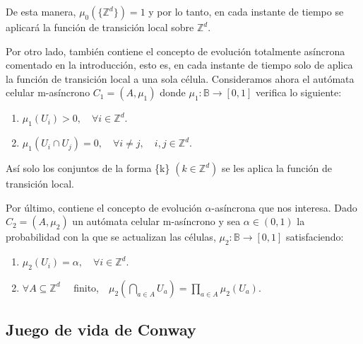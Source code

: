 \documentclass[../proyecto.tex]{memoir}
\begin{document}
De esta manera, $\mu_{0}(\{\mathds{Z}^{d}\})=1$ y por lo tanto, en cada instante de tiempo se aplicará la función de transición local sobre $\mathds{Z}^{d}$.

Por otro lado, también contiene el concepto de evolución totalmente asíncrona comentado en la introducción, esto es, en cada instante de tiempo solo de aplica la función de transición local a una sola célula. Consideramos ahora el autómata celular m-asíncrono $C_{1}=(A, \mu_{1})$ donde $\mu_{1}: \mathds{B} \rightarrow [0,1]$ verifica lo siguiente:

\begin{enumerate}
\item $\mu_{1}(U_{i}) > 0, \quad \forall i \in \mathds{Z}^{d}$.
\item $\mu_{1}(U_{i} \cap U_{j}) = 0, \quad \forall i \neq j, \quad i,j \in \mathds{Z}^{d}$.
\end{enumerate}

Así solo los conjuntos de la forma \{k\} $(k \in \mathds{Z}^{d})$ se les aplica la función de transición local.

Por último, contiene el concepto de evolución $\alpha$-asíncrona que nos interesa. Dado $C_{2}=(A, \mu_{2})$ un autómata celular m-asíncrono y sea $\alpha \in (0,1)$ la probabilidad con la que se actualizan las células, $\mu_{2}: \mathds{B} \rightarrow [0,1]$ satisfaciendo:

\begin{enumerate}
\item $\mu_{2}(U_{i}) = \alpha, \quad \forall i \in \mathds{Z}^{d}$.
\item $ \forall A \subseteq \mathds{Z}^{d} \quad$ finito,$\quad  \mu_{2} ( \bigcap_{a \in A} U_{a} ) = \prod_{a \in A} \mu_{2} ( U_{a} )$.
\end{enumerate}


\subsection{Juego de vida de Conway}
\end{document}
